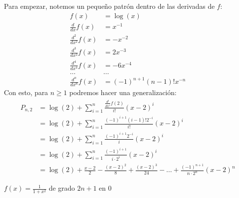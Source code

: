 \documentclass[../../main.tex]{subfiles}
\begin{document}
\begin{partes}
    Para empezar, notemos un pequeño patrón dentro de las derivadas de $f$:
    \begin{align*}
        f(x) &= \log(x)\\
        \frac{d}{dx} f(x) &= x^{-1}\\
        \frac{d^2}{dx^2} f(x) &= -x^{-2}\\
        \frac{d^3}{dx^3} f(x) &= 2x^{-3}\\
        \frac{d^4}{dx^4} f(x) &= -6x^{-4}\\
        \dots & \dots\\
        \frac{d^n}{dx^n} f(x) &= (-1)^{n+1} (n-1)! x^{-n}
    \end{align*}
    Con esto, para $n \ge 1$ podremos hacer una generalización:
    \begin{align*}
        P_{n, 2} &= \log(2) + \sum_{i = 1}^n \frac{\frac{d^i}{dx^i} f(2)}{i!} (x-2)^i\\
        &= \log(2) + \sum_{i = 1}^n \frac{(-1)^{i+1} (i-1)! 2^{-i}}{i!} (x-2)^i\\
        &= \log(2) + \sum_{i = 1}^n \frac{(-1)^{i+1} 2^{-i}}{i} (x-2)^i\\
        &= \log(2) + \sum_{i = 1}^n \frac{(-1)^{i+1}}{i\cdot 2^i} (x-2)^i\\
        &= \log(2) + \frac{x-2}{2} - \frac{(x-2)^2}{8} + \frac{(x-2)^3}{24} - \dots + \frac{(-1)^{n+1}}{n\cdot 2^n} (x-2)^n
    \end{align*}

    \parte $f(x) = \frac{1}{1+x^2}$ de grado $2n+1$ en 0\\


\end{partes}
\end{document}
